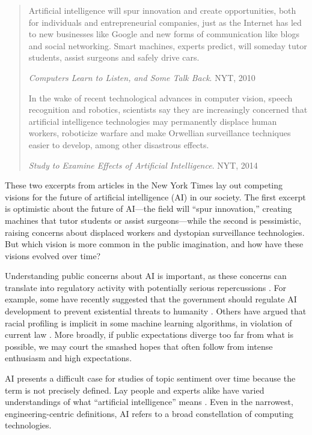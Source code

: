 \documentclass[letterpaper]{article}
\begin{document}
\begin{quote}
\footnotesize
Artificial intelligence will spur innovation and create opportunities, both for individuals and entrepreneurial companies, just as the Internet has led to new businesses like Google and new forms of communication like blogs and social networking. Smart machines, experts predict, will someday  tutor students, assist surgeons and safely drive cars.

\textit{Computers Learn to Listen, and Some Talk Back}. NYT, 2010

In the wake of recent technological advances in computer vision, speech recognition and robotics, scientists say they are increasingly concerned that artificial intelligence technologies may permanently displace human workers, roboticize warfare and make Orwellian surveillance techniques easier to develop, among other disastrous effects.

\textit{Study to Examine Effects of Artificial Intelligence}. NYT, 2014

\normalsize
\end{quote}

These two excerpts from articles in the New York Times lay out competing visions for the future of artificial intelligence (AI) in our society. The first excerpt is optimistic about the future of AI---the field will ``spur innovation,'' creating machines that tutor students or assist surgeons---while the second is pessimistic, raising concerns about displaced workers and dystopian surveillance technologies. But which vision is more common in the public imagination, and how have these visions evolved over time? 

Understanding public concerns about AI is important, as these concerns can translate into regulatory activity with potentially serious repercussions \cite{ai100}. For example, some have recently suggested that the government should regulate AI development to prevent existential threats to humanity \cite{elon-regulatory}. Others have argued that racial profiling is implicit in some machine learning algorithms, in violation of current law \cite{machine-bias}. More broadly, if public expectations diverge too far from what is possible, we may court the smashed hopes that often follow from intense enthusiasm and high expectations.   

AI presents a difficult case for studies of topic sentiment over time because the term is not precisely defined. Lay people and experts alike have varied understandings of what ``artificial intelligence'' means \cite{ai100}.  Even in the narrowest, engineering-centric definitions, AI refers to a broad constellation of computing technologies.
\end{document}
